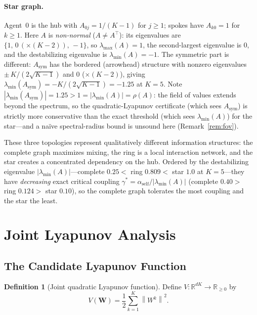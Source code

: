 \documentclass[12pt]{article}
\theoremstyle{plain}
\theoremstyle{definition}
\newtheorem{definition}[theorem]{Definition}
\newcommand{\R}{\mathbb{R}}
\newcommand{\W}{\mathbf{W}}
\newcommand{\norm}[1]{\left\lVert #1 \right\rVert}
\newcommand{\abs}[1]{\left| #1 \right|}
\begin{document}
\paragraph{Star graph.}  Agent~$0$ is the hub with $A_{0j} = 1/(K-1)$
for $j \geq 1$; spokes have $A_{k0} = 1$ for $k \geq 1$.  Here $A$ is
\emph{non-normal} ($A\neq A^\top$): its eigenvalues are
$\{1,\,0\,(\times(K-2)),\,-1\}$, so $\lambda_{\max}(A)=1$, the second-largest
eigenvalue is $0$, and the destabilizing eigenvalue is
$\lambda_{\min}(A)=-1$.  The symmetric part is different: $A_{\mathrm{sym}}$
has the bordered (arrowhead) structure with nonzero eigenvalues
$\pm\,K/(2\sqrt{K-1})$ and $0$ ($\times(K-2)$), giving
$\lambda_{\min}(A_{\mathrm{sym}}) = -K/(2\sqrt{K-1}) = -1.25$ at $K=5$.
Note $\abs{\lambda_{\min}(A_{\mathrm{sym}})}=1.25 > 1 = \abs{\lambda_{\min}(A)}
= \rho(A)$: the field of values extends beyond the spectrum, so the
quadratic-Lyapunov certificate (which sees $A_{\mathrm{sym}}$) is strictly
more conservative than the exact threshold (which sees $\lambda_{\min}(A)$)
for the star---and a na\"ive spectral-radius bound is unsound here
(Remark~\ref{rem:fov}).

These three topologies represent qualitatively different information
structures: the complete graph maximizes mixing, the ring is a local
interaction network, and the star creates a concentrated dependency on the
hub.  Ordered by the destabilizing eigenvalue $\abs{\lambda_{\min}(A)}$---complete
$0.25 <$ ring $0.809 <$ star $1.0$ at $K=5$---they have \emph{decreasing}
exact critical coupling
$\gamma^*=\alpha_{\mathrm{self}}/\abs{\lambda_{\min}(A)}$
(complete $0.40 >$ ring $0.124 >$ star $0.10$), so the complete graph
tolerates the most coupling and the star the least.

\section{Joint Lyapunov Analysis}
\label{sec:lyapunov}

\subsection{The Candidate Lyapunov Function}

\begin{definition}[Joint quadratic Lyapunov function]
  \label{def:V}
  Define $V : \R^{dK} \to \R_{\geq 0}$ by
  \begin{equation}
    V(\W) = \frac{1}{2} \sum_{k=1}^K \norm{W^k}^2.
    \label{eq:V}
  \end{equation}
\end{definition}
\end{document}
